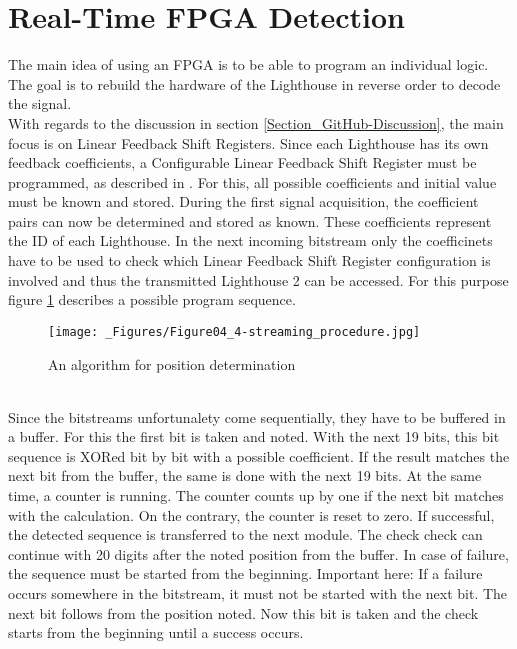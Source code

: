 \documentclass[a4paper,twoside, openright,12pt]{report}
\begin{document}
\section{Real-Time FPGA Detection}
\label{Section_FPGA}
The main idea of using an FPGA is to be able to program an individual logic. The goal is to rebuild the hardware of the Lighthouse in reverse order to decode the signal. \\
With regards to the discussion in section \ref{Section_GitHub-Discussion}, the main focus is on Linear Feedback Shift Registers. Since each Lighthouse has its own feedback coefficients, a Configurable Linear Feedback Shift Register must be programmed, as described in \cite{Mishra.2016031120160312}. For this, all possible coefficients and initial value must be known and stored. During the first signal acquisition, the coefficient pairs can now be determined and stored as known. These coefficients represent the ID of each Lighthouse. In the next incoming bitstream only the coefficinets have to be used to check which Linear Feedback Shift Register configuration is involved and thus the transmitted Lighthouse 2 can be accessed. For this purpose figure \ref{Streaming_Procedure} describes a possible program sequence.
\begin{figure}[h]
\begin{center}
\texttt{[image: \_Figures/Figure04\_4-streaming\_procedure.jpg]}
\caption{An algorithm for position determination}
\label{Streaming_Procedure}
\end{center}
\end{figure} \\
Since the bitstreams unfortunalety come sequentially, they have to be buffered in a buffer. For this the first bit is taken and noted. With the next 19 bits, this bit sequence is XORed bit by bit with a possible coefficient. If the result matches the next bit from the buffer, the same is done with the next 19 bits. At the same time, a counter is running. The counter counts up by one if the next bit matches with the calculation. On the contrary, the counter is reset to zero. If successful, the detected sequence is transferred to the next module. The check check can continue with 20 digits after the noted position from the buffer. In case of failure, the sequence must be started from the beginning. Important here: If a failure occurs somewhere in the bitstream, it must not be started with the next bit. The next bit follows from the position noted. Now this bit is taken and the check starts from the beginning until a success occurs. \\
\end{document}
